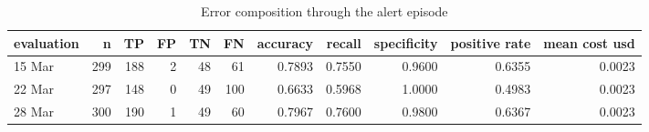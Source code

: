 \begin{table}
\caption{Error composition through the alert episode}
\label{tab:table-alert-mechanism}
\begin{tabular}{lrrrrrrrrrr}
\toprule
evaluation & n & TP & FP & TN & FN & accuracy & recall & specificity & positive rate & mean cost usd \\
\midrule
15 Mar & 299 & 188 & 2 & 48 & 61 & 0.7893 & 0.7550 & 0.9600 & 0.6355 & 0.0023 \\
22 Mar & 297 & 148 & 0 & 49 & 100 & 0.6633 & 0.5968 & 1.0000 & 0.4983 & 0.0023 \\
28 Mar & 300 & 190 & 1 & 49 & 60 & 0.7967 & 0.7600 & 0.9800 & 0.6367 & 0.0023 \\
\bottomrule
\end{tabular}
\end{table}
